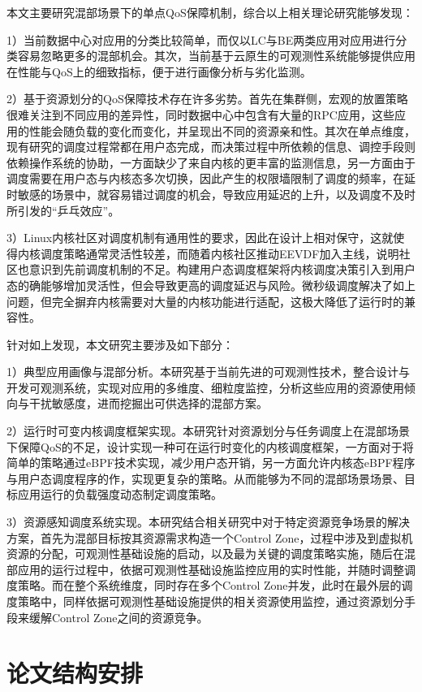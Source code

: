 本文主要研究混部场景下的单点QoS保障机制，综合以上相关理论研究能够发现：

1）当前数据中心对应用的分类比较简单，而仅以LC与BE两类应用对应用进行分类容易忽略更多的混部机会。其次，当前基于云原生的可观测性系统能够提供应用在性能与QoS上的细致指标，便于进行画像分析与劣化监测。

2）基于资源划分的QoS保障技术存在许多劣势。首先在集群侧，宏观的放置策略很难关注到不同应用的差异性，同时数据中心中包含有大量的RPC应用，这些应用的性能会随负载的变化而变化，并呈现出不同的资源亲和性。其次在单点维度，现有研究的调度过程常都在用户态完成，而决策过程中所依赖的信息、调控手段则依赖操作系统的协助，一方面缺少了来自内核的更丰富的监测信息，另一方面由于调度需要在用户态与内核态多次切换，因此产生的权限墙限制了调度的频率，在延时敏感的场景中，就容易错过调度的机会，导致应用延迟的上升，以及调度不及时所引发的“乒乓效应”。

3）Linux内核社区对调度机制有通用性的要求，因此在设计上相对保守，这就使得内核调度策略通常灵活性较差，而随着内核社区推动EEVDF加入主线，说明社区也意识到先前调度机制的不足。构建用户态调度框架将内核调度决策引入到用户态的确能够增加灵活性，但会导致更高的调度延迟与风险。微秒级调度解决了如上问题，但完全摒弃内核需要对大量的内核功能进行适配，这极大降低了运行时的兼容性。

针对如上发现，本文研究主要涉及如下部分：

1）典型应用画像与混部分析。本研究基于当前先进的可观测性技术，整合设计与开发可观测系统，实现对应用的多维度、细粒度监控，分析这些应用的资源使用倾向与干扰敏感度，进而挖掘出可供选择的混部方案。

2）运行时可变内核调度框架实现。本研究针对资源划分与任务调度上在混部场景下保障QoS的不足，设计实现一种可在运行时变化的内核调度框架，一方面对于将简单的策略通过eBPF技术实现，减少用户态开销，另一方面允许内核态eBPF程序与用户态调度程序的作，实现更复杂的策略。从而能够为不同的混部场景场景、目标应用运行的负载强度动态制定调度策略。

3）资源感知调度系统实现。本研究结合相关研究中对于特定资源竞争场景的解决方案，首先为混部目标按其资源需求构造一个Control Zone，过程中涉及到虚拟机资源的分配，可观测性基础设施的启动，以及最为关键的调度策略实施，随后在混部应用的运行过程中，依据可观测性基础设施监控应用的实时性能，并随时调整调度策略。而在整个系统维度，同时存在多个Control Zone并发，此时在最外层的调度策略中，同样依据可观测性基础设施提供的相关资源使用监控，通过资源划分手段来缓解Control Zone之间的资源竞争。

\section{论文结构安排}

